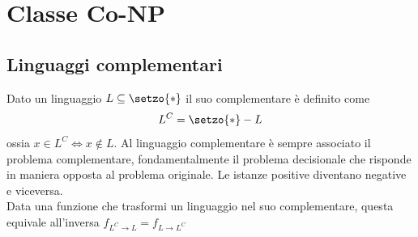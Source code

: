 \section{Classe Co-NP}

\subsection{Linguaggi complementari}
\begin{definition}
    \label{def:linguaggiocomplementare}
    Dato un linguaggio $
    L \subseteq \setzo{*}
    $
    il suo complementare è definito come
    \begin{equation*}
        L^C = \setzo{*} - L
    \end{equation*}
    ossia
    $
        x \in L^C \Leftrightarrow x \notin L
    $.
    Al linguaggio complementare è sempre associato il problema complementare, fondamentalmente il problema decisionale che risponde in maniera opposta al problema originale. Le istanze positive diventano negative e viceversa.
    \\
    Data una funzione che trasformi un linguaggio nel suo complementare, questa equivale all'inversa
    $
        f_{L^C \to L}
        =
        f_{L \to L^C}
    $
\end{definition}

